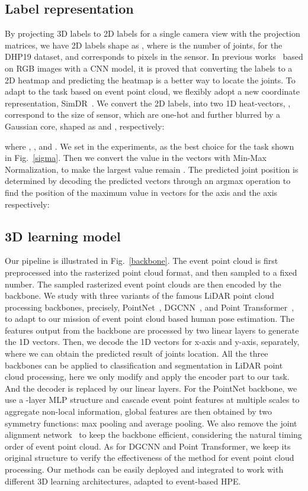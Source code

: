 \documentclass[10pt,twocolumn,letterpaper]{article}
\begin{document}
\subsection{Label representation}
By projecting 3D labels to 2D labels for a single camera view with the projection matrices, we have 2D labels shape as , where  is the number of joints,  for the DHP19 dataset, and  corresponds to pixels in the sensor.
In previous works~\cite{newell2016stackedhourglass, wei2016convposemachain, xiao2018simbase} based on RGB images with a CNN model, it is proved that converting the labels to a 2D heatmap and predicting the heatmap is a better way to locate the joints.
To adapt to the task based on event point cloud, we flexibly adopt a new coordinate representation, SimDR~\cite{li20212dsimdr}.
We convert the 2D labels,  into two 1D heat-vectors, , correspond to the size of sensor, which are one-hot and further blurred by a Gaussian core, shaped as  and , respectively: 


where , , and .
We set  in the experiments, as the best choice for the task shown in Fig.~\ref{sigma}. 
Then we convert the value in the vectors with Min-Max Normalization, to make the largest value remain . The predicted joint position  is determined by decoding the predicted vectors  through an argmax operation to find the position of the maximum value in vectors for the  axis and the  axis respectively:


\subsection{3D learning model}
Our pipeline is illustrated in Fig.~\ref{backbone}.
The event point cloud is first preprocessed into the rasterized point cloud format, and then sampled to a fixed number.
The sampled rasterized event point clouds are then encoded by the backbone.
We study with three variants of the famous LiDAR point cloud processing backbones, precisely, PointNet~\cite{qi2017pointnet}, DGCNN~\cite{wang2019dgcnn}, and Point Transformer~\cite{zhao2021pointtrans}, to adapt to our mission of event point cloud based human pose estimation.
The features output from the backbone are processed by two linear layers to generate the 1D vectors.
Then, we decode the 1D vectors for x-axis and y-axis, separately, where we can obtain the predicted result of joints location.
All the three backbones can be applied to classification and segmentation in LiDAR point cloud processing, here we only modify and apply the encoder part to our task.
And the decoder is replaced by our linear layers.
For the PointNet backbone, we use a -layer MLP structure and cascade event point features at multiple scales to aggregate non-local information, global features are then obtained by two symmetry functions: max pooling and average pooling. We also remove the joint alignment network~\cite{qi2017pointnet} to keep the backbone efficient, considering the natural timing order of event point cloud. As for DGCNN and Point Transformer, we keep its original structure to verify the effectiveness of the method for event point cloud processing.
Our methods can be easily deployed and integrated to work with different 3D learning architectures, adapted to event-based HPE.
\end{document}
